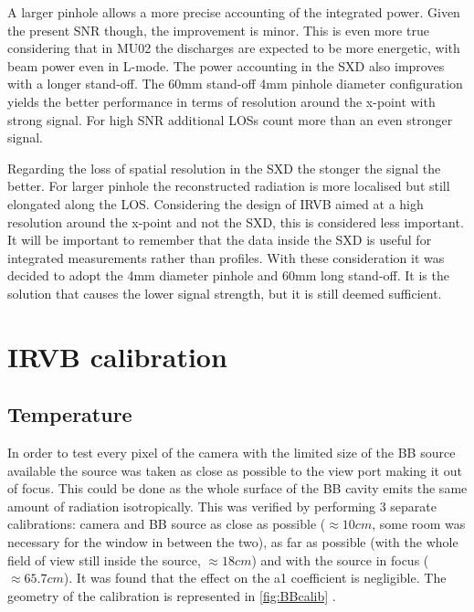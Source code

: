 A larger pinhole allows a more precise accounting of the integrated power. Given the present SNR though, the improvement is minor. This is even more true considering that in MU02 the discharges are expected to be more energetic, with beam power even in L-mode. The power accounting in the SXD also improves with a longer stand-off.
The 60mm stand-off 4mm pinhole diameter configuration yields the better performance in terms of resolution around the x-point with strong signal. For high SNR additional LOSs count more than an even stronger signal.

Regarding the loss of spatial resolution in the SXD the stonger the signal the better. For larger pinhole the reconstructed radiation is more localised but still elongated along the LOS. Considering the design of IRVB aimed at a high resolution around the x-point and not the SXD, this is considered less important. It will be important to remember that the data inside the SXD is useful for integrated measurements rather than profiles.
With these consideration it was decided to adopt the 4mm diameter pinhole and 60mm long stand-off. It is the solution that causes the lower signal strength, but it is still deemed sufficient.

\section{IRVB calibration}\label{IRVBcalibration}
\subsection{Temperature}

In order to test every pixel of the camera with the limited size of the BB source available the source was taken as close as possible to the view port making it out of focus. This could be done as the whole surface of the BB cavity emits the same amount of radiation isotropically. This was verified by performing 3 separate calibrations: camera and BB source as close as possible ($\approx 10cm$, some room was necessary for the window in between the two), as far as possible (with the whole field of view still inside the source, $\approx 18cm$) and with the source in focus ($\approx 65.7cm$). It was found that the effect on the a1 coefficient is negligible.
The geometry of the calibration is represented in \autoref{fig:BBcalib} .

